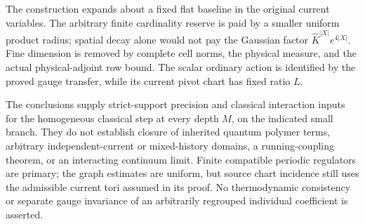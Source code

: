 \documentclass[11pt]{article}
\theoremstyle{remark}\newtheorem{remark}[theorem]{Remark}
\begin{document}
The construction expands about a fixed flat baseline in the original
current variables. The arbitrary finite cardinality reserve is paid by
a smaller uniform product radius; spatial decay alone would not pay
the Gaussian factor $\widehat K^{|X|}e^{4|X|}$. Fine dimension is removed
by complete cell norms, the physical measure, and the actual
physical-adjoint row bound. The scalar ordinary action is identified by
the proved gauge transfer, while its current pivot chart has fixed
ratio $L$.

The conclusions supply strict-support precision and classical
interaction inputs for the homogeneous classical step at every depth
$M$, on the indicated small branch. They do not establish closure of
inherited quantum polymer terms, arbitrary independent-current or
mixed-history domains, a running-coupling theorem, or an interacting
continuum limit. Finite compatible periodic regulators are primary;
the graph estimates are uniform, but source chart incidence still uses
the admissible current tori assumed in its proof. No thermodynamic
consistency or separate gauge invariance of an arbitrarily regrouped
individual coefficient is asserted.
\end{document}
